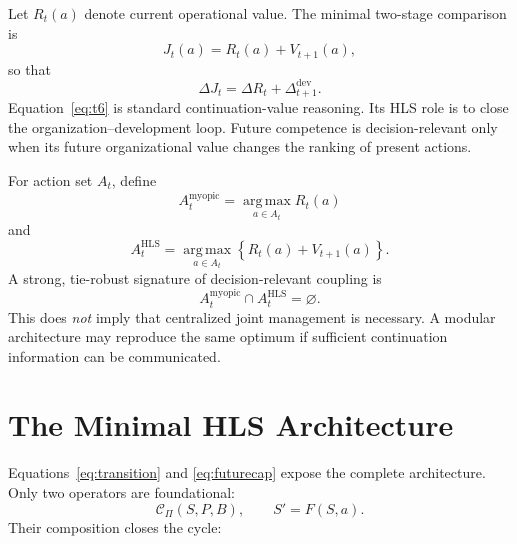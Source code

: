 \documentclass[10pt]{article}
\newcommand{\Ccap}{\mathcal{C}}
\newcommand{\argmax}{\operatorname*{arg\,max}}
\begin{document}
Let $R_t(a)$ denote current operational value. The minimal two-stage comparison is
\begin{equation}
J_t(a)=R_t(a)+V_{t+1}(a),
\end{equation}
so that
\begin{equation}
\Delta J_t
=
\Delta R_t+
\Delta^{\mathrm{dev}}_{t+1}.
\label{eq:t6}
\end{equation}
Equation~\eqref{eq:t6} is standard continuation-value reasoning. Its HLS role is to close the organization--development loop. Future competence is decision-relevant only when its future organizational value changes the ranking of present actions.

For action set $A_t$, define
\begin{equation}
A_t^{\mathrm{myopic}}=\argmax_{a\in A_t}R_t(a)
\end{equation}
and
\begin{equation}
A_t^{\mathrm{HLS}}=\argmax_{a\in A_t}
\left\{R_t(a)+V_{t+1}(a)\right\}.
\end{equation}
A strong, tie-robust signature of decision-relevant coupling is
\begin{equation}
A_t^{\mathrm{myopic}}\cap A_t^{\mathrm{HLS}}=\varnothing.
\label{eq:decisioncoupling}
\end{equation}
This does \emph{not} imply that centralized joint management is necessary. A modular architecture may reproduce the same optimum if sufficient continuation information can be communicated.

\section{The Minimal HLS Architecture}

Equations~\eqref{eq:transition} and \eqref{eq:futurecap} expose the complete architecture. Only two operators are foundational:
\begin{equation}
\boxed{\Ccap_{\Pi}(S,P,B)},
\qquad
\boxed{S'=F(S,a)}.
\end{equation}
Their composition closes the cycle:
\end{document}
